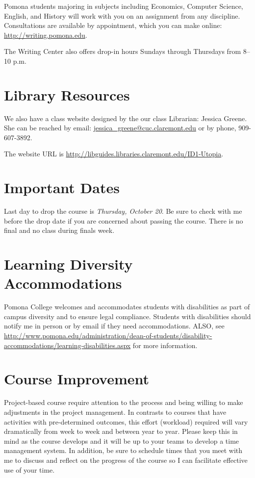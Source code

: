 Pomona students majoring in subjects including Economics, Computer Science, English, and History will work with you on an assignment from any discipline. Consultations are available by appointment, which you can make online: \url{http://writing.pomona.edu}.

The Writing Center also offers drop-in hours Sundays through Thursdays from 8–10 p.m.

\section{Library Resources}

We also have a class website designed by the our class Librarian: Jessica Greene. She can be reached by email: \url{jessica_greene@cuc.claremont.edu} or by phone, 909-607-3892.

The website URL is \url{http://libguides.libraries.claremont.edu/ID1-Utopia}.

\section{Important Dates} 
Last day  to drop the course is \emph{Thursday, October 20}. Be sure to check with me before the drop date if you are concerned about passing the course. There is no final and no class during finals week. 

\section{Learning Diversity Accommodations} 

Pomona College welcomes and accommodates students with disabilities as part of campus diversity and to ensure legal compliance. Students with disabilities should notify me in person or by email if they need accommodations. ALSO, see \url{http://www.pomona.edu/administration/dean-of-students/disability-accommodations/learning-disabilities.aspx} for more information.

\section{Course Improvement}
Project-based course require attention to the process and being willing to make adjustments in the project management. In contrasts to courses that have activities with pre-determined outcomes, this effort (workload) required will vary dramatically from week to week and between year to year. Please keep this in mind as the course develops and it will be up to your teams to develop a time management system. In addition, be sure to schedule times that you meet with me to discuss and reflect on the progress of the course so I can facilitate effective use of your time.

